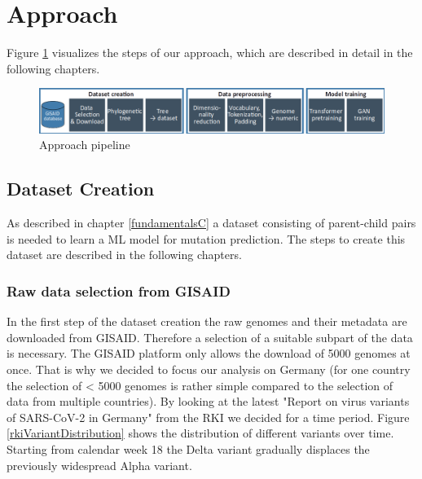\section{Approach} 
\label{approach}

Figure \ref{pipeline} visualizes the steps of our approach, which are described in detail in the following chapters.

\begin{figure}[ht]
	\centering
	\includegraphics[width=1.0\linewidth]{figures/pipeline.png}
	\caption{Approach pipeline \cite{own representation}}
	\label{pipeline}
\end{figure}


\subsection{Dataset Creation}  \label{ch:approachA}

As described in chapter \ref{fundamentalsC} a dataset consisting of parent-child pairs is needed to learn a \ac{ML} model for mutation prediction. The steps to create this dataset are described in the following chapters.

\subsubsection{Raw data selection from \ac{GISAID}}
\label{ch:approachAa}

In the first step of the dataset creation the raw genomes and their metadata are downloaded from \ac{GISAID}. Therefore a selection of a suitable subpart of the data is necessary. The \ac{GISAID} platform only allows the download of 5000 genomes at once. That is why we decided to focus our analysis on Germany (for one country the selection of < 5000 genomes is rather simple compared to the selection of data from multiple countries). By looking at the latest "Report on virus variants of SARS-CoV-2 in Germany" from the \ac{RKI} we decided for a time period. Figure \ref{rkiVariantDistribution} shows the distribution of different variants over time. Starting from calendar week 18 the Delta variant gradually displaces the previously widespread Alpha variant.


